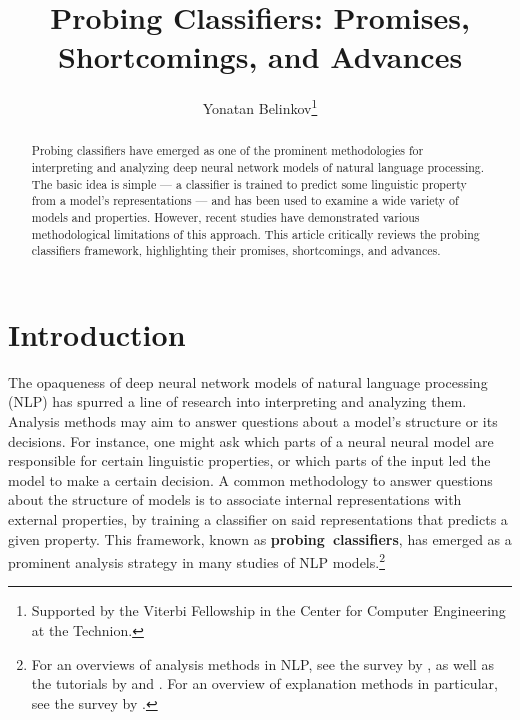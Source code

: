 \documentclass[discussion]{clv3}
\begin{document}
\title{Probing Classifiers: Promises, Shortcomings, and Advances}


\author{Yonatan Belinkov\thanks{Supported by the Viterbi Fellowship in the Center for Computer Engineering at the Technion.}}




\maketitle

\begin{abstract}
Probing classifiers have emerged as one of the prominent methodologies for interpreting and analyzing deep neural network models of natural language processing. The basic idea is simple --- a classifier is trained to predict some linguistic property from a model's representations --- and has been used to examine a wide variety of models and properties. However, recent studies have demonstrated various methodological limitations of this approach. This article critically reviews the probing classifiers framework, highlighting their promises, shortcomings, and advances. 
\end{abstract}

\section{Introduction}

The opaqueness of deep neural network models of natural language processing (NLP) has spurred a line of research into interpreting and analyzing them. 
Analysis methods may aim to answer questions about a model's structure or its decisions. For instance, one might  ask which parts of a neural neural model are responsible for certain linguistic properties, or which parts of the input led the model to make a certain decision. 
A common methodology to answer questions about the structure of models is to associate internal representations with external properties, by training a classifier on said representations that predicts a given property. This framework, known as \mbox{\textbf{probing classifiers}}, has emerged as a prominent analysis strategy in many studies of NLP models.\footnote{For an overviews of analysis methods in NLP, see the survey by \citet{belinkov-glass-2019-analysis}, as well as the tutorials by \citet{belinkov-etal-2020-interpretability} and \citet{wallace-etal-2020-interpreting}. For an overview of explanation methods in particular, see the survey by \citet{danilevsky-etal-2020-survey}.}  
\end{document}
